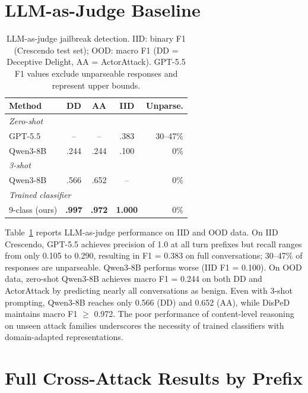 
\appendix

\section{LLM-as-Judge Baseline}
\label{sec:llm_judge}

\begin{table}[t]
\centering
\small
\caption{LLM-as-judge jailbreak detection. IID: binary F1 (Crescendo test set); OOD: macro F1 (DD = Deceptive Delight, AA = ActorAttack). GPT-5.5 F1 values exclude unparseable responses and represent upper bounds.}
\label{tab:llm_judge}
\begin{tabular}{@{}lcccr@{}}
\toprule
\textbf{Method} & DD & AA & IID & Unparse. \\
\midrule
\multicolumn{5}{l}{\textit{Zero-shot}} \\[2pt]
GPT-5.5 & -- & -- & .383 & 30--47\% \\
Qwen3-8B & .244 & .244 & .100 & 0\% \\
\midrule
\multicolumn{5}{l}{\textit{3-shot}} \\[2pt]
Qwen3-8B & .566 & .652 & -- & 0\% \\
\midrule
\multicolumn{5}{l}{\textit{Trained classifier}} \\[2pt]
9-class (ours) & \textbf{.997} & \textbf{.972} & \textbf{1.000} & 0\% \\
\bottomrule
\end{tabular}
\end{table}

Table~\ref{tab:llm_judge} reports LLM-as-judge performance on IID and OOD data.
On IID Crescendo, GPT-5.5 achieves precision of 1.0 at all turn prefixes but recall ranges from only 0.105 to 0.290, resulting in F1 = 0.383 on full conversations; 30--47\% of responses are unparseable.
Qwen3-8B performs worse (IID F1 = 0.100).
On OOD data, zero-shot Qwen3-8B achieves macro F1 = 0.244 on both DD and ActorAttack by predicting nearly all conversations as benign.
Even with 3-shot prompting, Qwen3-8B reaches only 0.566 (DD) and 0.652 (AA), while DisPeD maintains macro F1 $\geq$ 0.972.
The poor performance of content-level reasoning on unseen attack families underscores the necessity of trained classifiers with domain-adapted representations.

\section{Full Cross-Attack Results by Prefix}
\label{sec:full_prefix}

